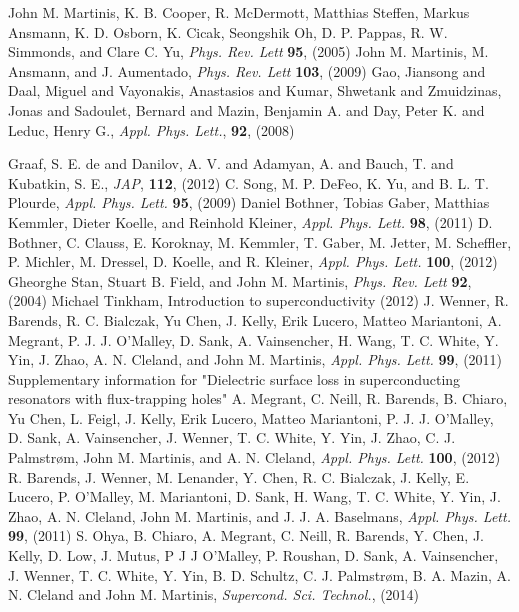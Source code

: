 \documentclass[aip,jap,reprint,nobalancelastpage]{revtex4-1}
\begin{document}
\begin{thebibliography}{99}
John M. Martinis, K. B. Cooper, R. McDermott, Matthias Steffen, Markus Ansmann, K. D. Osborn, K. Cicak, Seongshik Oh, D. P. Pappas, R. W. Simmonds, and Clare C. Yu, \textit{Phys. Rev. Lett} \textbf{95}, (2005)
 John M. Martinis, M. Ansmann, and J. Aumentado, \textit{Phys. Rev. Lett} \textbf{103}, (2009)
 Gao, Jiansong and Daal, Miguel and Vayonakis, Anastasios and Kumar, Shwetank and Zmuidzinas, Jonas and Sadoulet, Bernard and Mazin, Benjamin A. and Day, Peter K. and Leduc, Henry G., \textit{Appl. Phys. Lett.}, \textbf{92}, (2008)

 Graaf, S. E. de and Danilov, A. V. and Adamyan, A. and Bauch, T. and Kubatkin, S. E., \textit{JAP}, \textbf{112},  (2012)
 C.  Song, M. P.  DeFeo, K.  Yu, and B. L. T.  Plourde, \textit{Appl. Phys. Lett.} \textbf{95},  (2009)
  Daniel Bothner,  Tobias Gaber,  Matthias Kemmler,  Dieter Koelle, and  Reinhold Kleiner, \textit{Appl. Phys. Lett.} \textbf{98},  (2011)
 D.  Bothner, C.  Clauss, E.  Koroknay, M.  Kemmler, T.  Gaber, M.  Jetter, M.  Scheffler, P.  Michler, M.  Dressel, D.  Koelle, and R.  Kleiner, \textit{Appl. Phys. Lett.} \textbf{100},  (2012)
  Gheorghe Stan,  Stuart B. Field, and  John M. Martinis, \textit{Phys. Rev. Lett} \textbf{92},  (2004)
Michael Tinkham, Introduction to superconductivity (2012)
 J.  Wenner, R.  Barends, R. C.  Bialczak,  Yu Chen, J.  Kelly,  Erik Lucero,  Matteo Mariantoni, A.  Megrant, P. J. J.  O’Malley, D.  Sank, A.  Vainsencher, H.  Wang, T. C.  White, Y.  Yin, J.  Zhao, A. N.  Cleland, and  John M. Martinis, \textit{Appl. Phys. Lett.} \textbf{99},  (2011)
Supplementary information for "Dielectric surface loss in superconducting resonators with flux-trapping holes"
 A.  Megrant, C.  Neill, R.  Barends, B.  Chiaro,  Yu Chen, L.  Feigl, J.  Kelly,  Erik Lucero,  Matteo Mariantoni, P. J. J.  O’Malley, D.  Sank, A.  Vainsencher, J.  Wenner, T. C.  White, Y.  Yin, J.  Zhao, C. J.  Palmstrøm,  John M. Martinis, and A. N.  Cleland, \textit{Appl. Phys. Lett.} \textbf{100},  (2012)
 R.  Barends, J.  Wenner, M.  Lenander, Y.  Chen, R. C.  Bialczak, J.  Kelly, E.  Lucero, P.  O’Malley, M.  Mariantoni, D.  Sank, H.  Wang, T. C.  White, Y.  Yin, J.  Zhao, A. N.  Cleland,  John M. Martinis, and J. J. A.  Baselmans, \textit{Appl. Phys. Lett.} \textbf{99},  (2011)
 S. Ohya, B. Chiaro, A. Megrant, C. Neill, R. Barends, Y. Chen, J. Kelly, D. Low, J. Mutus,  P J J O’Malley,  P. Roushan,  D. Sank, A. Vainsencher, J. Wenner, T. C. White, Y. Yin, B. D. Schultz, C. J. Palmstrøm, B. A. Mazin, A. N. Cleland and John M. Martinis,  \textit{Supercond. Sci. Technol.}, (2014)

\end{thebibliography}
\end{document}
